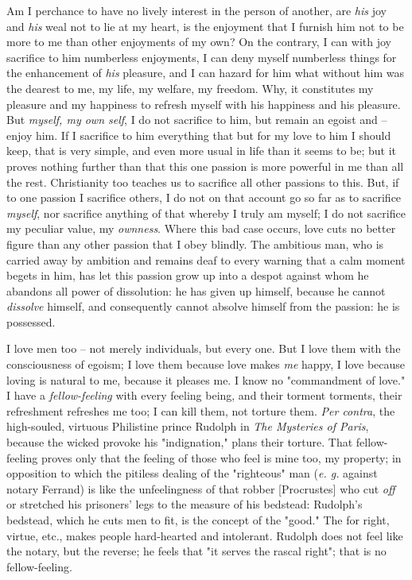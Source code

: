\documentclass[a4paper]{book}
\begin{document}
Am I perchance to have no lively interest in the person of another, are 
\textit{his} joy and \textit{his} weal not to lie at my heart, is the 
enjoyment that I furnish him not to be more to me than other enjoyments of my 
own? On the contrary, I can with joy sacrifice to him numberless enjoyments, I 
can deny myself numberless things for the enhancement of \textit{his} 
pleasure, and I can hazard for him what without him was the dearest to me, my 
life, my welfare, my freedom. Why, it constitutes my pleasure and my happiness 
to refresh myself with his happiness and his pleasure. But \textit{myself, my 
own self}, I do not sacrifice to him, but remain an egoist and -- enjoy him. 
If I sacrifice to him everything that but for my love to him I should keep, 
that is very simple, and even more usual in life than it seems to be; but it 
proves nothing further than that this one passion is more powerful in me than 
all the rest. Christianity too teaches us to sacrifice all other passions to 
this. But, if to one passion I sacrifice others, I do not on that account go 
so far as to sacrifice \textit{myself}, nor sacrifice anything of that whereby 
I truly am myself; I do not sacrifice my peculiar value, my \textit{ownness}. 
Where this bad case occurs, love cuts no better figure than any other passion 
that I obey blindly. The ambitious man, who is carried away by ambition and 
remains deaf to every warning that a calm moment begets in him, has let this 
passion grow up into a despot against whom he abandons all power of 
dissolution: he has given up himself, because he cannot \textit{dissolve} 
himself, and consequently cannot absolve himself from the passion: he is 
possessed.

I love men too -- not merely individuals, but every one. But I love them with 
the consciousness of egoism; I love them because love makes \textit{me} happy, 
I love because loving is natural to me, because it pleases me. I know no 
"{}commandment of love."{} I have a \textit{fellow-feeling} with every feeling 
being, and their torment torments, their refreshment refreshes me too; I can 
kill them, not torture them. \textit{Per contra}, the high-souled, virtuous 
Philistine prince Rudolph in \textit{The Mysteries of Paris}, because the 
wicked provoke his "{}indignation,"{} plans their torture. That fellow-feeling 
proves only that the feeling of those who feel is mine too, my property; in 
opposition to which the pitiless dealing of the "{}righteous"{} man 
(\textit{e. g.} against notary Ferrand) is like the unfeelingness of that 
robber [Procrustes] who cut \textit{off} or stretched his prisoners' legs to 
the measure of his bedstead: Rudolph's bedstead, which he cuts men to fit, is 
the concept of the "{}good."{} The for right, virtue, etc., makes people 
hard-hearted and intolerant. Rudolph does not feel like the notary, but the 
reverse; he feels that "{}it serves the rascal right"{}; that is no 
fellow-feeling.
\end{document}
